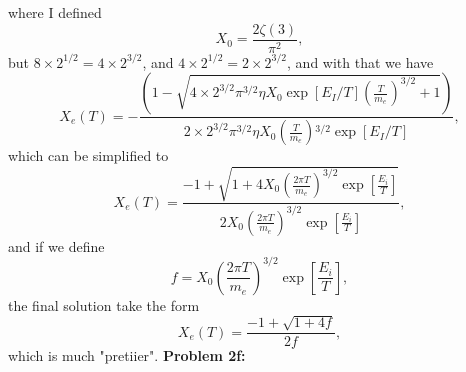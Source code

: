 \documentclass[11pt]{article}
\begin{document}
where I defined 
\begin{displaymath}
  X_0 = \frac{2\zeta(3)}{\pi^2},
\end{displaymath}
but $8\times2^{1/2}=4\times2^{3/2}$, and $4\times 2^{1/2} = 2\times 2^{3/2}$, and with that we have
\begin{displaymath}
  X_e(T)  = -\frac{ \left(1 -\sqrt{4\times2^{3/2} \pi^{3/2} \eta  X_0 \exp[E_I/T] 
   \left(\frac{T}{m_e}^{}\right)^{3/2}+1}\right)}{2\times 2^{3/2} \pi
   ^{3/2} \eta  X_0 \left(\frac{T}{m_e}\right){}^{3/2}\exp[E_I/T]},
\end{displaymath}
which can be simplified to
\begin{displaymath}
  X_e(T) = \frac{-1+\sqrt{1 + 4 X_0\left(\frac{2\pi T}{m_e}\right)^{3/2} \exp\left[\frac{E_i}{T}\right]}}{2X_0\left(\frac{2\pi T}{m_e}\right)^{3/2} \exp\left[\frac{E_i}{T}\right]},
\end{displaymath}
and if we define 
\begin{displaymath}
  f = X_0\left(\frac{2\pi T}{m_e}\right)^{3/2} \exp\left[\frac{E_i}{T}\right],
\end{displaymath}
the final solution take the form
\begin{displaymath}
  X_e(T) = \frac{-1 + \sqrt{1+4f}}{2f},
\end{displaymath}
which is much "pretiier".
\newline
\textbf{Problem 2f:}
\end{document}
